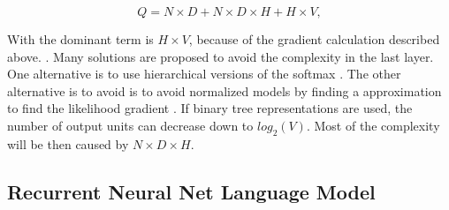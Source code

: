 \begin{center}
\begin{equation} Q = N \times D + N \times D \times H + H \times V,   \end{equation}
\end{center}

With the dominant term is $H \times V$, because of the gradient calculation
described above.
\cite{DBLP:journals/corr/abs-1301-3781}. Many solutions are proposed to avoid
the complexity in the last layer. One alternative is to use  hierarchical
versions of the softmax \cite{Morin05hierarchicalprobabilistic,6163930}.
The other alternative is to avoid is to avoid  normalized models by finding
a approximation to find the likelihood gradient \cite{NIPS2013_5165} . If binary tree representations are
used, the number of output units can decrease down to $log_2(V)$. Most
of the complexity will be then caused by  $N \times D \times H$.






\subsection{Recurrent Neural Net Language Model}

